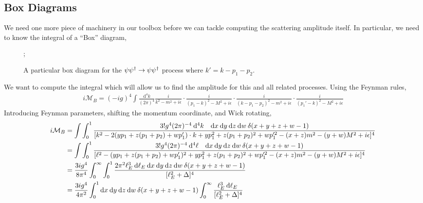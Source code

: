 \documentclass{article}
\begin{document}
\subsection{Box Diagrams}
We need one more piece of machinery in our toolbox before we can tackle computing the scattering amplitude itself. In particular, we need to know the integral of a ``Box'' diagram,
\begin{figure}
\begin{center}
;
\caption{A particular box diagram for the $\psi \psi^\dagger \to \psi \psi^\dagger$ process where $k' = k - p_1 - p_2$.}
\end{center}
\end{figure}
We want to compute the integral which will allow us to find the amplitude for this and all related processes. Using the Feynman rules,
\begin{align*}
i\mathcal{M}_B = (-ig)^4 \int \frac{\mathrm{d}^4 k}{(2 \pi)^4} \frac{i}{k^2 - m^2 + i \epsilon} \cdot \frac{i}{(p_1 - k)^2 - M^2 + i \epsilon} \cdot \frac{i}{(k - p_1 - p_2)^2 - m^2 + i \epsilon} \cdot \frac{i}{(p_1' - k)^2 - M^2 + i \epsilon} 
\end{align*}
Introducing Feynman parameters, shifting the momentum coordinate, and Wick rotating,
\begin{align*}
i\mathcal{M}_B & = \int \int_0^1 \frac{3! g^4 (2\pi)^{-4} \:\mathrm{d}^4 k\quad \mathrm{d}x \: \mathrm{d}y \: \mathrm{d}z \: \mathrm{d}w \: \delta(x + y + z + w - 1)}{[k^2 - 2( y p_1 + z (p_1 + p_2) +  w p_1')\cdot k + y p_1^2 + z (p_1 + p_2)^2 + w p_1'^2 - (x + z)m^2 - (y + w)M^2 + i \epsilon ]^4}
\\
& = \int \int_0^1 \frac{3! g^4 (2\pi)^{-4} \:\mathrm{d}^4 \ell \quad \mathrm{d}x \: \mathrm{d}y \: \mathrm{d}z \: \mathrm{d}w \: \delta(x + y + z + w - 1)}{[\ell^2 - (y p_1 + z (p_1 + p_2) + w p_1' )^2 + y p_1^2 + z (p_1 + p_2)^2 + w p_1'^2 - (x + z)m^2 - (y + w)M^2 + i \epsilon ]^4}
\\
& = \frac{3ig^4}{8 \pi^4} \int_{0}^\infty \int_0^1 \frac{2\pi^2 \ell_E^3 \: \mathrm{d}\ell_E \: \mathrm{d}x \: \mathrm{d}y \: \mathrm{d}z \: \mathrm{d}w \: \delta(x + y + z + w - 1)}{[\ell_E^2 + \Delta ]^4}
\\
& = \frac{3ig^4}{4 \pi^2} \int_0^1 \mathrm{d}x \: \mathrm{d}y \: \mathrm{d}z \: \mathrm{d}w \: \delta(x + y + z + w - 1) \int_{0}^\infty \frac{ \ell_E^3 \: \mathrm{d}\ell_E \:}{[\ell_E^2 + \Delta ]^4}
\end{align*}
\end{document}
